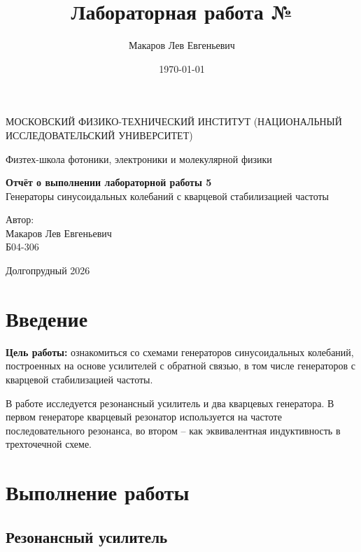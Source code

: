 \documentclass[a4paper,12pt]{article}
\author{Макаров Лев Евгеньевич}
\title{Лабораторная работа №\labnumber\\\labname}
\date{\today}
\newcommand\labname{Генераторы синусоидальных колебаний с кварцевой стабилизацией частоты}
\newcommand\labnumber{5}
\begin{document}
\begin{titlepage}
    \begin{center}
        {\large МОСКОВСКИЙ ФИЗИКО-ТЕХНИЧЕСКИЙ ИНСТИТУТ (НАЦИОНАЛЬНЫЙ ИССЛЕДОВАТЕЛЬСКИЙ УНИВЕРСИТЕТ)}
    \end{center}
    \begin{center}
        {\large Физтех-школа фотоники, электроники и молекулярной физики}
    \end{center}

    \vspace{4.5cm}
    {\huge
        \begin{center}
            {\bf Отчёт о выполнении лабораторной работы \labnumber}\\
            \labname
        \end{center}
    }
    \vspace{2cm}
    \begin{flushright}
        {\LARGE Автор:\\ Макаров Лев Евгеньевич\\
        \vspace{0.2cm}
        Б04-306}
    \end{flushright}
    \vspace{8cm}
    \begin{center}
        Долгопрудный 2026
    \end{center}
\end{titlepage}

\section{Введение}

\textbf{Цель работы:} ознакомиться со схемами генераторов синусоидальных колебаний, построенных на основе усилителей с обратной связью, в том числе генераторов с кварцевой стабилизацией частоты.

В работе исследуется резонансный усилитель и два кварцевых генератора. В первом генераторе кварцевый резонатор используется на частоте последовательного резонанса, во втором -- как эквивалентная индуктивность в трехточечной схеме.

\section{Выполнение работы}

\subsection*{Резонансный усилитель}
\end{document}
